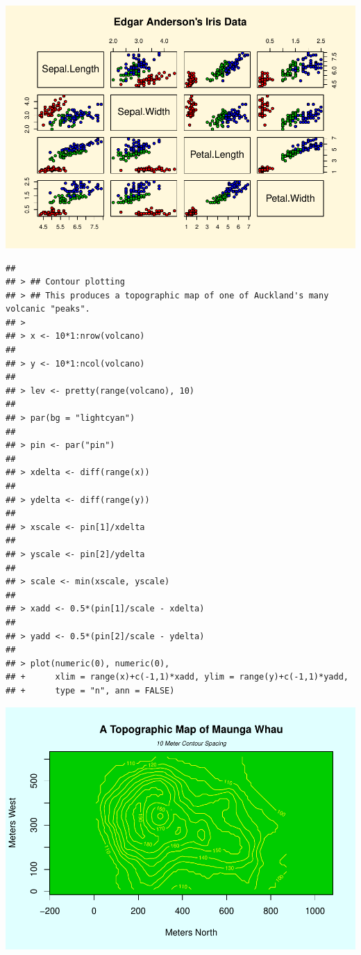 \documentclass[
]{book}
\begin{document}
\includegraphics{bookdown-demo_files/figure-latex/unnamed-chunk-5-9.pdf}

\begin{verbatim}
## 
## > ## Contour plotting
## > ## This produces a topographic map of one of Auckland's many volcanic "peaks".
## > 
## > x <- 10*1:nrow(volcano)
## 
## > y <- 10*1:ncol(volcano)
## 
## > lev <- pretty(range(volcano), 10)
## 
## > par(bg = "lightcyan")
## 
## > pin <- par("pin")
## 
## > xdelta <- diff(range(x))
## 
## > ydelta <- diff(range(y))
## 
## > xscale <- pin[1]/xdelta
## 
## > yscale <- pin[2]/ydelta
## 
## > scale <- min(xscale, yscale)
## 
## > xadd <- 0.5*(pin[1]/scale - xdelta)
## 
## > yadd <- 0.5*(pin[2]/scale - ydelta)
## 
## > plot(numeric(0), numeric(0),
## +      xlim = range(x)+c(-1,1)*xadd, ylim = range(y)+c(-1,1)*yadd,
## +      type = "n", ann = FALSE)
\end{verbatim}

\includegraphics{bookdown-demo_files/figure-latex/unnamed-chunk-5-10.pdf}
\end{document}
